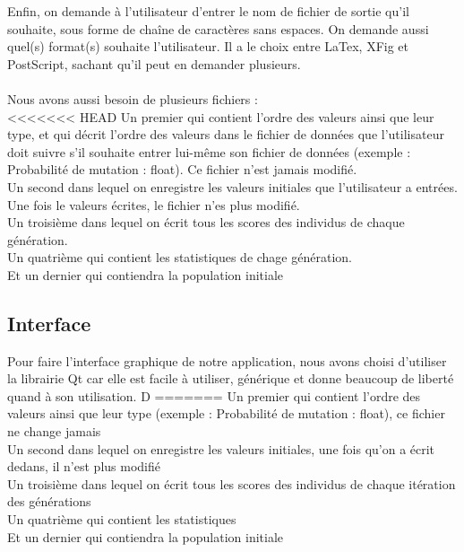 \documentclass[a4paper,11pt]{article}
\begin{document}
		Enfin, on demande à l’utilisateur d’entrer le nom de fichier de sortie qu’il souhaite, sous forme de chaîne de caractères sans espaces.
		On demande aussi quel(s) format(s) souhaite l’utilisateur.
		Il a le choix entre LaTex, XFig et PostScript, sachant qu’il peut en demander plusieurs.\\
		\\
		Nous avons aussi besoin de plusieurs fichiers :\\
<<<<<<< HEAD
		Un premier qui contient l’ordre des valeurs ainsi que leur type, et qui décrit l'ordre des valeurs dans le fichier de données que l'utilisateur doit suivre s'il souhaite entrer lui-même son fichier de données (exemple : Probabilité de mutation : float). Ce fichier n'est jamais modifié.\\
		Un second dans lequel on enregistre les valeurs initiales que l'utilisateur a entrées. Une fois le valeurs écrites, le fichier n'es plus modifié.\\
		Un troisième dans lequel on écrit tous les scores des individus de chaque génération.\\
		Un quatrième qui contient les statistiques de chage génération.\\
		Et un dernier qui contiendra la population initiale
		
		\subsection{Interface}
			Pour faire l'interface graphique de notre application, nous avons choisi d'utiliser la librairie Qt car elle est facile à utiliser, générique et donne beaucoup de liberté quand à son utilisation. 
			D%
=======
		Un premier qui contient l’ordre des valeurs ainsi que leur type (exemple : Probabilité de mutation : float), ce fichier ne change jamais\\
		Un second dans lequel on enregistre les valeurs initiales, une fois qu’on a écrit dedans, il n’est plus modifié\\
		Un troisième dans lequel on écrit tous les scores des individus de chaque itération des générations\\
		Un quatrième qui contient les statistiques\\
		Et un dernier qui contiendra la population initiale
		
\end{document}
